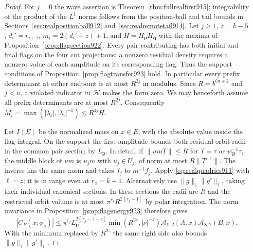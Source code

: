 \documentclass[a4paper,11pt]{article}
\theoremstyle{definition}
\theoremstyle{remark}
\numberwithin{equation}{section}
\begin{document}
\begin{proof}
For \(j=0\) the wave assertion is Theorem~\ref{thm:fullrealfirst915};
integrability of the product of the \(L^1\) norms follows from
the position-ball and tail bounds in
Sections~\ref{sec:realpositionball912} and~\ref{sec:realremotetail914}.
Let \(j\ge1\), \(z=k-5\), \(d_i'=r_{i+1}\),
\(m_i=2(d_i'-z)+1\), and
\(H=H_{\mathbf p}H_{\mathbf q}\) with the maxima of
Proposition~\ref{prop:flagsection922}. Every pair contributing
has both initial and final flags on the four cut projections:
a nonzero residual density requires a nonzero value of each
amplitude on its corresponding flag. Thus the support conditions
of Proposition~\ref{prop:flagtransfer923} hold. In particular
every prefix determinant at either endpoint is at most \(R^{2j}\)
in modulus. Since \(R=b^{6n+2}\) and \(j<n\), a violated
indicator in \(\mathcal H\) makes the form zero. We may henceforth
assume all prefix determinants are at most \(R^{2j}\).
Consequently \(M_i=\max(|\lambda_i|,|\lambda_i|^{-1})\le
R^{4j}H\).

Let \(I(E)\) be the normalized mass on \(x\in E\), with the
absolute value inside the flag integral. On the support the
first amplitude bounds both residual orbit radii in the common
pair section by \(L_{\mathbf p}\). In detail, if
\(\|u mT\|\le R\) for \(T=\tau\) or \(w_{\mathbf p}^{-1}\tau\),
the middle block of \(um\) is \(u_jm\) with \(u_j\in U_j\),
of norm at most \(R\|T^{-1}\|\). The inverse has the same
norm and takes \(f_j\) to \(m^{-1}f_j\). Apply
\eqref{eq:realquadrics911} with \(\ell=z\); it is in range
even at \(r_a=k+1\). Alternatively use \(\|g\|_1\|g'\|_1\),
taking their individual canonical sections. In these sections
the radii are \(R\) and the restricted orbit volume is at most
\(\pi^{r_j}R^{2(r_j-1)}\) by polar integration. The norm
invariance in Proposition~\ref{prop:flagenergy923} therefore gives
\[
 |C_P(x;\phi_\nu)|\le
 \pi^{r_j}L_{\mathbf p}^{2(r_j-1-z)}
 \min(R^{2z},|\nu|^{-z})
       \mathcal A_{\mathbf1,2}(A,x)\mathcal A_{\boldsymbol\lambda,2}(B,x).
\]
With the minimum replaced by \(R^{2z}\) the same right side
also bounds \(\|g\|_1\|g'\|_1\).


\end{proof}
\end{document}
